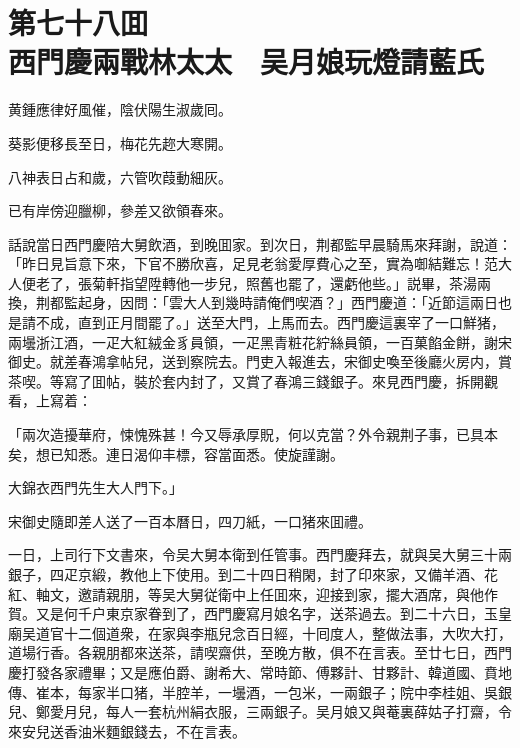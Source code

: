 
\chapter*{第七十八囬　\\西門慶兩戰林太太　吴月娘玩燈請藍氏}


\begin{myquote}
黄鍾應律好風催，陰伏陽生淑歲囘。

葵影便移長至日，梅花先趂大寒開。

八神表日占和歲，六管吹葭動細灰。

已有岸傍迎臘柳，參差又欲領春來。
\end{myquote}

話說當日西門慶陪大舅飲酒，到晚囬家。到次日，荆都監早晨騎馬來拜謝，說道：「昨日見旨意下來，下官不勝欣喜，足見老翁愛厚費心之至，實為啣結難忘！范大人便老了，張菊軒指望陞轉他一步兒，照舊也罷了，還虧他些。」説畢，茶湯兩換，荆都監起身，因問：「雲大人到幾時請俺們喫酒？」西門慶道：「近節這兩日也是請不成，直到正月間罷了。」送至大門，上馬而去。西門慶這裏宰了一口鮮猪，兩壜浙江酒，一疋大紅絨金豸員領，一疋黑青粧花紵絲員領，一百菓餡金餅，謝宋御史。就差春鴻拿帖兒，送到察院去。門吏入報進去，宋御史喚至後廳火房内，賞茶喫。等寫了囬帖，裝於套内封了，又賞了春鴻三錢銀子。來見西門慶，拆開觀看，上寫着：

\begin{myquote}[\markfont]
「兩次造擾華府，悚愧殊甚！今又辱承厚貺，何以克當？外令親荆子事，已具本矣，想已知悉。連日渴仰丰標，容當面悉。使旋謹謝。


\raggedright{大錦衣西門先生大人門下。」}
\end{myquote}

宋御史隨即差人送了一百本曆日，四刀紙，一口猪來囬禮。

一日，上司行下文書來，令吴大舅本衛到任管事。西門慶拜去，就與吴大舅三十兩銀子，四疋京緞，教他上下使用。到二十四日稍閑，封了印來家，又備羊酒、花紅、軸文，邀請親朋，等吴大舅従衛中上任囬來，迎接到家，擺大酒席，與他作賀。又是何千户東京家眷到了，西門慶寫月娘名字，送茶過去。到二十六日，玉皇廟吴道官十二個道衆，在家與李瓶兒念百日經，十囘度人，整做法事，大吹大打，道場行香。各親朋都來送茶，請喫齋供，至晚方散，俱不在言表。至廿七日，西門慶打發各家禮畢；又是應伯爵、謝希大、常時節、傅夥計、甘夥計、韓道國、賁地傳、崔本，每家半口猪，半腔羊，一壜酒，一包米，一兩銀子；院中李桂姐、吳銀兒、鄭愛月兒，每人一套杭州絹衣服，三兩銀子。吴月娘又與菴裏薛姑子打齋，令來安兒送香油米麵銀錢去，不在言表。

